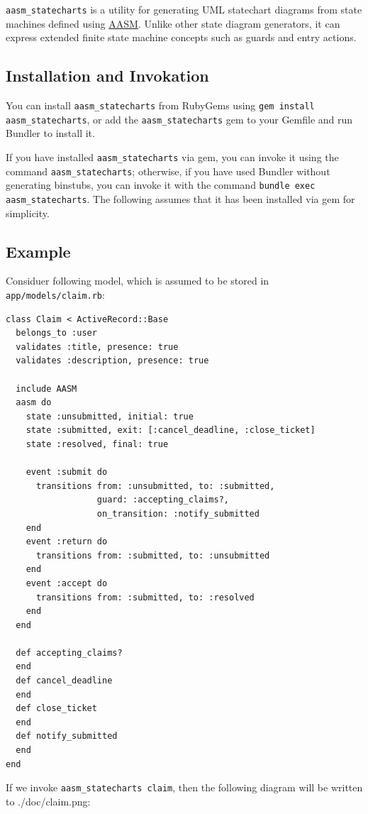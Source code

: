 \documentclass[document.tex]{subfiles}
\begin{document}
{\tt aasm\_statecharts} is a utility for generating UML statechart diagrams from state machines defined using \href{https://github.com/aasm/aasm}{AASM}. Unlike other state diagram generators, it can express extended finite state machine concepts such as guards and entry actions.

\subsection{Installation and Invokation}

You can install {\tt aasm\_statecharts} from RubyGems using {\tt gem install aasm\_statecharts}, or add the {\tt aasm\_statecharts} gem to your Gemfile and run Bundler to install it.

If you have installed {\tt aasm\_statecharts} via gem, you can invoke it using the command {\tt aasm\_statecharts}; otherwise, if you have used Bundler without generating binstubs, you can invoke it with the command {\tt bundle exec aasm\_statecharts}. The following assumes that it has been installed via gem for simplicity.

\pagebreak

\subsection{Example}

Considuer following model, which is assumed to be stored in {\tt app/models/claim.rb}:
\begin{lstlisting}
class Claim < ActiveRecord::Base
  belongs_to :user
  validates :title, presence: true
  validates :description, presence: true

  include AASM
  aasm do
    state :unsubmitted, initial: true
    state :submitted, exit: [:cancel_deadline, :close_ticket]
    state :resolved, final: true

    event :submit do
      transitions from: :unsubmitted, to: :submitted,
                  guard: :accepting_claims?,
                  on_transition: :notify_submitted
    end
    event :return do
      transitions from: :submitted, to: :unsubmitted
    end
    event :accept do
      transitions from: :submitted, to: :resolved
    end
  end

  def accepting_claims?
  end
  def cancel_deadline
  end
  def close_ticket
  end
  def notify_submitted
  end
end
\end{lstlisting}

\pagebreak

If we invoke {\tt aasm\_statecharts claim}, then the following diagram will be written to ./doc/claim.png:
\end{document}
